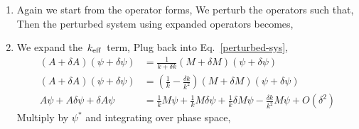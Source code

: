 \documentclass{school-22.211-notes}
\begin{document}
\clearpage
{}
\begin{enumerate}
\item Again we start from the operator forms, 
We perturb the operators such that, 
Then the perturbed system using expanded operators becomes, 

\item We expand the $\left. k_{\mathrm{eff}} \right.$ term, 
Plug back into Eq.~\ref{perturbed-sys}, 
\begin{align}
(A + \delta A) (\psi + \delta \psi) &= \frac{1}{k+\delta k} (M + \delta M) (\psi + \delta \psi) \\
(A + \delta A) (\psi + \delta \psi) &= \left( \frac{1}{k} - \frac{\delta k}{k^2}  \right) (M + \delta M) (\psi + \delta \psi) \\
A \psi + A \delta \psi + \delta A \psi &= \frac{1}{k} M \psi + \frac{1}{k} M \delta \psi + \frac{1}{k} \delta M \psi - \frac{\delta k}{k^2} M \psi + O(\delta^2)  
\end{align}
Multiply by $\psi^*$ and integrating over phase space, 


\end{enumerate}
\end{document}
